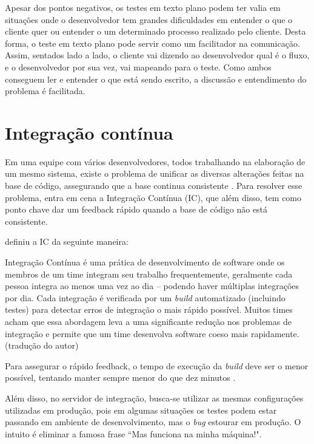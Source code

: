 Apesar dos pontos negativos, os testes em texto plano podem ter valia em situações onde o desenvolvedor tem grandes dificuldades em entender o que o cliente quer ou entender o um determinado processo realizado pelo cliente. Desta forma, o teste em texto plano pode servir como um facilitador na comunicação. Assim, sentados lado a lado, o cliente vai dizendo ao desenvolvedor qual é o fluxo, e o desenvolvedor por sua vez, vai mapeando para o teste. Como ambos conseguem ler e entender o que está sendo escrito, a discussão e entendimento do problema é facilitada.




\section{Integração contínua} %
\label{sec:integracao_continua}

Em uma equipe com vários desenvolvedores, todos trabalhando na elaboração de um mesmo sistema, existe o problema de unificar as diversas alterações feitas na base de código, assegurando que a base continua consistente \cite{ImproveitCI}. Para resolver esse problema, entra em cena a Integração Contínua (IC), que além disso, tem como ponto chave dar um feedback rápido quando a base de código não está consistente.

\cite{FowlerCI} definiu a IC da seguinte maneira:

\begin{citacao}
Integração Contínua é uma prática de desenvolvimento de software onde os membros de um time integram seu trabalho frequentemente, geralmente cada pessoa integra ao menos uma vez ao dia – podendo haver múltiplas integrações por dia. Cada integração é verificada por um \textit{build} automatizado (incluindo testes) para detectar erros de integração o mais rápido possível. Muitos times acham que essa abordagem leva a uma significante redução nos problemas de integração e permite que um time desenvolva software coeso mais rapidamente. (tradução do autor)
\end{citacao}

Para assegurar o rápido feedback, o tempo de execução da \textit{build} deve ser o menor possível, tentando manter sempre menor do que dez minutos \cite{FowlerCI}.

Além disso, no servidor de integração, busca-se utilizar as mesmas configurações utilizadas em produção, pois em algumas situações os testes podem estar passando em ambiente de desenvolvimento, mas o \textit{bug} estourar em produção. O intuito é eliminar a famosa frase ``Mas funciona na minha máquina!".

